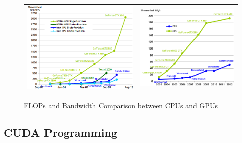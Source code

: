 \documentclass{llncs}
\begin{document}
\begin{figure}[H]
\begin{center}
\begin{tabular}{cc}
\includegraphics[scale=0.46]{flops.png} & \includegraphics[scale=0.5]{bw.png} \\
\end{tabular}
\caption{FLOPs and Bandwidth Comparison between CPUs and GPUs \cite{cuda}}
\label{fig:flops}
\end{center}
\end{figure}

\subsection{CUDA Programming}
\end{document}
